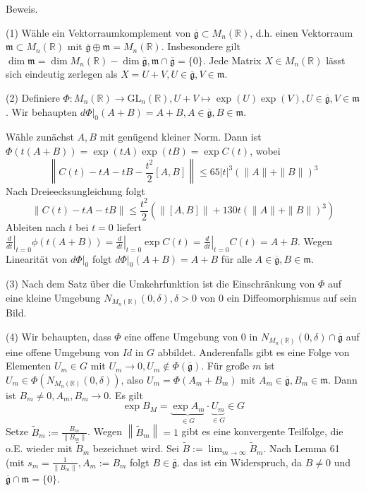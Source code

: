 \documentclass[10pt, letterpaper]{article}
\begin{document}
Beweis. 

(1) Wähle ein Vektorraumkomplement von $\overline{\mathfrak{g}} \subset M_{n}(\mathbb{R})$, d.h. einen Vektorraum $\mathfrak{m} \subset M_{n}(\mathbb{R})$ mit $\overline{\mathfrak{g}} \oplus \mathfrak{m}=M_{n}(\mathbb{R})$. Insbesondere gilt $\operatorname{dim} \mathfrak{m}=\operatorname{dim} M_{n}(\mathbb{R})-\operatorname{dim} \overline{\mathfrak{g}}, \mathfrak{m} \cap \overline{\mathfrak{g}}=\{0\}$. Jede Matrix $X \in M_{n}(\mathbb{R})$ lässt sich eindeutig zerlegen als $X= U+V, U \in \overline{\mathfrak{g}}, V \in \mathfrak{m}$.


(2) Definiere $\Phi: M_{n}(\mathbb{R}) \rightarrow \mathrm{GL}_{n}(\mathbb{R}), U+V \mapsto \exp (U) \exp (V), U \in \overline{\mathfrak{g}}, V \in \mathfrak{m}$. Wir behaupten $\left.d \Phi\right|_{0}(A+B)=A+B, A \in \overline{\mathfrak{g}}, B \in \mathfrak{m}$.

Wähle zunächst $A, B$ mit genügend kleiner Norm. Dann ist $\Phi(t(A+B))=\exp (t A) \exp (t B)=\exp C(t)$, wobei
$$
\left\|C(t)-t A-t B-\frac{t^{2}}{2}[A, B]\right\| \leq 65|t|^{3}(\|A\|+\|B\|)^{3}
$$
Nach Dreieecksungleichung folgt
$$\|C(t)-t A-t B\| \leq \frac{t^{2}}{2}\left(\|[A, B]\|+130 t(\|A\|+\|B\|)^{3}\right)$$
Ableiten nach $t$ bei $t=0$ liefert $\left.\frac{d}{d t}\right|_{t=0} \phi(t(A+B))=\left.\frac{d}{d t}\right|_{t=0} \exp C(t)= \left.\frac{d}{d t}\right|_{t=0} C(t)=A+B$. Wegen Linearität von $\left.d \Phi\right|_{0}$ folgt $\left.d \Phi\right|_{0}(A+ B)=A+B$ für alle $A \in \overline{\mathfrak{g}}, B \in \mathfrak{m}$.

(3) Nach dem Satz über die Umkehrfunktion ist die Einschränkung von $\Phi$ auf eine kleine Umgebung $N_{M_{n}(\mathbb{R})}(0, \delta), \delta>0$ von 0 ein Diffeomorphismus auf sein Bild.

(4) Wir behaupten, dass $\Phi$ eine offene Umgebung von 0 in $N_{M_{n}(\mathbb{R})}(0, \delta) \cap \overline{\mathfrak{g}}$ auf eine offene Umgebung von $I d$ in $G$ abbildet. Anderenfalls gibt es eine Folge von Elementen $U_{m} \in G$ mit $U_{m} \rightarrow 0, U_{m} \notin \Phi(\overline{\mathfrak{g}})$. Für große $m$ ist $U_{m} \in \Phi\left(N_{M_{n}(\mathbb{R})}(0, \delta)\right)$, also $U_{m}=\Phi\left(A_{m}+B_{m}\right)$ mit $A_{m} \in \overline{\mathfrak{g}}, B_{m} \in \mathfrak{m}$. Dann ist $B_{m} \neq 0, A_{m}, B_{m} \rightarrow 0$.
Es gilt
$$
\exp B_{M}=\underbrace{\exp A_{m}}_{\in G} \cdot \underbrace{U_{m}}_{\in G} \in G
$$
Setze $\tilde{B}_{m}:=\frac{B_{m}}{\left\|B_{m}\right\|}$. Wegen $\left\|\tilde{B}_{m}\right\|=1$ gibt es eine konvergente Teilfolge, die o.E. wieder mit $\tilde{B}_{m}$ bezeichnet wird. Sei $\tilde{B}:= \lim _{m \rightarrow \infty} \tilde{B}_{m}$. Nach Lemma 61 (mit $s_{m}=\frac{1}{\left\|B_{m}\right\|}, A_{m}:=B_{m}$ folgt $B \in \overline{\mathfrak{g}}$. das ist ein Widerspruch, da $B \neq 0$ und $\overline{\mathfrak{g}} \cap \mathfrak{m}=\{0\}$.
\end{document}
